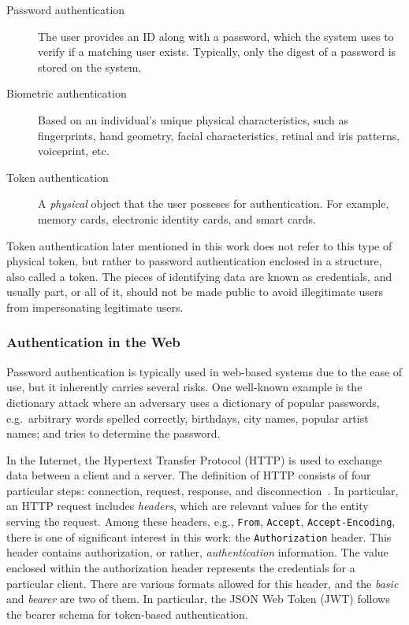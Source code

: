 \documentclass[12pt]{article}
\begin{document}
\begin{description}
\item[Password authentication] The user provides an ID along with a password, which the system uses to verify if a matching user exists. Typically, only the digest of a password is stored on the system. 
\item[Biometric authentication] Based on an individual's unique physical characteristics, such as fingerprints, hand geometry, facial characteristics, retinal and iris patterns, voiceprint, etc. 
\item[Token authentication] A \emph{physical} object that the user posseses for authentication. For example, memory cards, electronic identity cards, and smart cards. 
\end{description}

Token authentication later mentioned in this work does not refer to this type of physical token, but rather to password authentication enclosed in a structure, also called a token.
The pieces of identifying data are known as credentials, and usually part, or all of it, should not be made public to avoid illegitimate users from impersonating legitimate users.

\subsubsection{Authentication in the Web}

Password authentication is typically used in web-based systems due to the ease of use, but it inherently carries several risks. One well-known example is the dictionary attack where an adversary uses a dictionary of popular passwords, e.g.\ arbitrary words spelled correctly, birthdays, city names, popular artist names; and tries to determine the password. 

In the Internet, the Hypertext Transfer Protocol (HTTP) is used to exchange data between a client and a server. The definition of HTTP consists of four particular steps: connection, request, response, and disconnection~\cite{RFC2616}. In particular, an HTTP request includes \emph{headers}, which are relevant values for the entity serving the request. Among these headers, e.g., \texttt{From}, \texttt{Accept}, \texttt{Accept-Encoding}, there is one of significant interest in this work: the \texttt{Authorization} header. This header contains authorization, or rather, \emph{authentication} information. The value enclosed within the authorization header represents the credentials for a particular client. There are various formats allowed for this header, and the \emph{basic} and \emph{bearer} are two of them. In particular, the JSON Web Token (JWT) follows the bearer schema for token-based authentication.
\end{document}

